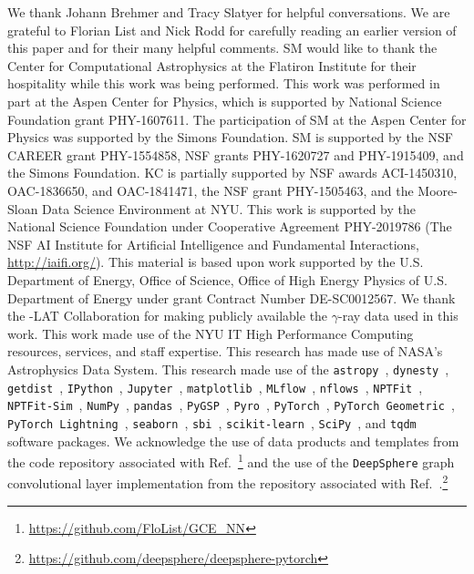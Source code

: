 \documentclass[prd,aps,10pt,nofootinbib,twocolumn,superscriptaddress,preprintnumbers,balancelastpage,longbibliography,floatfix]{revtex4-2}
\begin{document}
\begin{acknowledgments}

We thank Johann Brehmer and Tracy Slatyer for helpful conversations. We are grateful to Florian List and Nick Rodd for carefully reading an earlier version of this paper and for their many helpful comments.
SM would like to thank the Center for Computational Astrophysics at the Flatiron Institute for their hospitality while this work was being performed. 
This work was performed in part at the Aspen Center for Physics, which is supported by National Science Foundation grant PHY-1607611.
The participation of SM at the Aspen Center for Physics was supported by the Simons Foundation.
SM is supported by the NSF CAREER grant PHY-1554858, NSF grants PHY-1620727 and PHY-1915409, and the Simons Foundation. 
KC is partially supported by NSF awards ACI-1450310, OAC-1836650, and OAC-1841471, the NSF grant PHY-1505463, and the Moore-Sloan Data Science Environment at NYU. 
This work is supported by the National Science Foundation under Cooperative Agreement PHY-2019786 (The NSF AI Institute for Artificial Intelligence and Fundamental Interactions, \url{http://iaifi.org/}).
This material is based upon work supported by the U.S. Department of Energy, Office of Science, Office of High Energy Physics of U.S. Department of Energy under grant Contract Number DE-SC0012567.
We thank the \Fermi-LAT Collaboration for making publicly available the $\gamma$-ray data used in this work.
This work made use of the NYU IT High Performance Computing resources, services, and staff expertise. 
This research has made use of NASA's Astrophysics Data System. 
This research made use of the \texttt{astropy}~\cite{Price-Whelan:2018hus,Robitaille:2013mpa}, \texttt{dynesty}~\cite{Speagle_2020}, \texttt{getdist}~\cite{Lewis:2019xzd}, \texttt{IPython}~\cite{PER-GRA:2007}, \texttt{Jupyter}~\cite{Kluyver2016JupyterN}, \texttt{matplotlib}~\cite{Hunter:2007}, \texttt{MLflow}~\cite{10.1145/3399579.3399867}, \texttt{nflows}~\cite{nflows}, \texttt{NPTFit}~\cite{Mishra-Sharma:2016gis}, \texttt{NPTFit-Sim}~\cite{NPTFit-Sim}, \texttt{NumPy}~\cite{harris2020array}, \texttt{pandas}~\cite{pandas:2010}, \texttt{PyGSP}~\cite{michael_defferrard_2017_1003158}, \texttt{Pyro}~\cite{bingham2019pyro}, \texttt{PyTorch}~\cite{NEURIPS2019_9015}, \texttt{PyTorch Geometric}~\cite{Fey/Lenssen/2019}, \texttt{PyTorch Lightning}~\cite{william_falcon_2020_3828935}, \texttt{seaborn}~\cite{seaborn}, \texttt{sbi}~\cite{tejero-cantero2020sbi}, \texttt{scikit-learn}~\cite{JMLR:v12:pedregosa11a}, \texttt{SciPy}~\cite{2020SciPy-NMeth}, and \texttt{tqdm}~\cite{casper_da_costa_luis_2021_5517697} software packages. We acknowledge the use of data products and templates from the code repository associated with Ref.~\cite{List:2020mzd}\footnote{\url{https://github.com/FloList/GCE_NN}} and the use of the \texttt{DeepSphere} graph convolutional layer implementation from the repository associated with Ref.~\cite{DBLP:conf/iclr/DefferrardMGP20}.\footnote{\url{https://github.com/deepsphere/deepsphere-pytorch}}
\end{acknowledgments}
\end{document}
